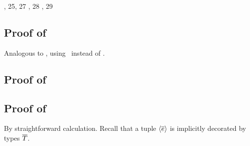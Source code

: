 \begin{derivation}
     {\Reapp, 25, 27}
     {\Reabs, 28}
      {\Reabsalpha, 29}
\end{derivation}


\subsection*{Proof of }

Analogous to , using \ReexIop\ instead of \Refaop.



\subsection*{Proof of }

\begin{derivation}
\step{\istyO{\trecO}}{\hyp}
\step{\hastyO{\expr}{\trecO}}{\hyp}
\end{derivation}



\subsection*{Proof of }

By straightforward calculation. Recall that a tuple $\langle\overline{e}\rangle$ is
implicitly decorated by types $\overline{T}$.



